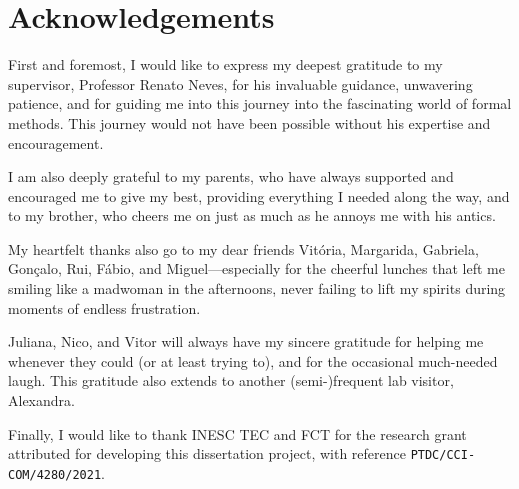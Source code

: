 \chapter*{Acknowledgements}

First and foremost, I would like to express my deepest gratitude to my supervisor, Professor Renato Neves, for his invaluable guidance, unwavering patience, and for guiding me into this journey into the fascinating world of formal methods. This journey would not have been possible without his expertise and encouragement.

I am also deeply grateful to my parents, who have always supported and encouraged me to give my best, providing everything I needed along the way, and to my brother, who cheers me on just as much as he annoys me with his antics.

My heartfelt thanks also go to my dear friends Vitória, Margarida, Gabriela, Gonçalo, Rui, Fábio, and Miguel—especially for the cheerful lunches that left me smiling like a madwoman in the afternoons, never failing to lift my spirits during moments of endless frustration.

Juliana, Nico, and Vitor will always have my sincere gratitude for helping me whenever they could (or at least trying to), and for the occasional much-needed laugh. This gratitude also extends to another (semi-)frequent lab visitor, Alexandra.

Finally, I would like to thank INESC TEC and FCT for the research  grant attributed for developing this dissertation project, with reference  \texttt{PTDC/CCI-COM/4280/2021}.
